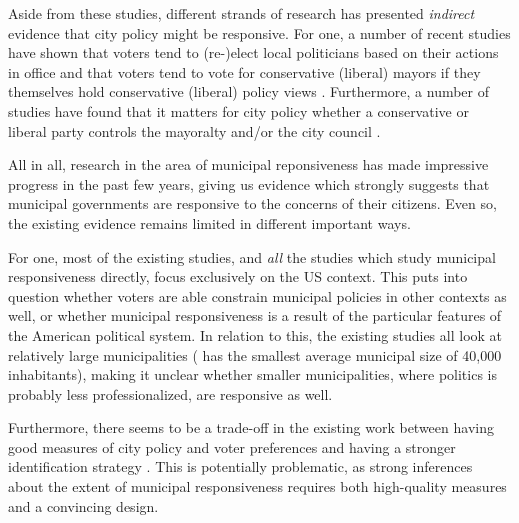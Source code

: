 \documentclass[a4paper,12pt]{article}
\begin{document}
Aside from these studies, different strands of research has presented \textit{indirect} evidence that city policy might be responsive. For one, a number of recent studies have shown that voters tend to (re-)elect local politicians based on their actions in office \citep{arnold2012holding,burnett2017politics} and that voters tend to vote for conservative (liberal)  mayors if they themselves hold conservative (liberal) policy views  \citep{sances2017ideology,boudreau2015lost,hopkins2017retrospective}. Furthermore, a number of studies have found that it matters for city policy whether a conservative or liberal party controls the mayoralty and/or the city council \citep{fiva2016power,folke2014shades,blom2006parties,de2016mayoral}. 


All in all, research in the area of municipal reponsiveness has made impressive progress in the past few years, giving us evidence which strongly suggests that municipal governments are responsive to the concerns of their citizens. Even so, the existing evidence remains limited in different important ways.

For one, most of the existing studies, and \textit{all} the studies which study municipal responsiveness directly, focus exclusively on the US context. This puts into question whether voters are able constrain municipal policies in other contexts as well, or whether municipal responsiveness is a result of the particular features of the American political system. In relation to this, the existing studies all look at relatively large municipalities (\citealp{einstein2016pushing} has the smallest average municipal size of 40,000 inhabitants), making it unclear whether smaller municipalities, where politics is probably less professionalized, are responsive as well.

Furthermore, there seems to be a trade-off in the existing work between having good measures of city policy and voter preferences \citep[cf.]{tausanovitch2014representation} and having a stronger identification strategy \citep[cf.]{sances2017voters}. This is potentially problematic, as strong inferences about the extent of municipal responsiveness requires both high-quality measures and a convincing design.
\end{document}

